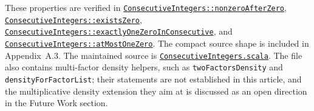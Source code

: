 {\raggedright
These properties are verified in
\href{https://github.com/thiagomata/prime-numbers/blob/modulo-article-v1.0.0/src/main/scala/v1/chapter2/div/properties/ConsecutiveIntegers.scala}{\texttt{ConsecutiveIntegers::\allowbreak nonzeroAfterZero}},
\href{https://github.com/thiagomata/prime-numbers/blob/modulo-article-v1.0.0/src/main/scala/v1/chapter2/div/properties/ConsecutiveIntegers.scala}{\texttt{ConsecutiveIntegers::\allowbreak existsZero}},
\href{https://github.com/thiagomata/prime-numbers/blob/modulo-article-v1.0.0/src/main/scala/v1/chapter2/div/properties/ConsecutiveIntegers.scala}{\texttt{ConsecutiveIntegers::\allowbreak exactlyOneZeroInConsecutive}},
and
\href{https://github.com/thiagomata/prime-numbers/blob/modulo-article-v1.0.0/src/main/scala/v1/chapter2/div/properties/ConsecutiveIntegers.scala}{\texttt{ConsecutiveIntegers::\allowbreak atMostOneZero}}.
The compact source shape is included in Appendix~A.3. The maintained source
is
\href{https://github.com/thiagomata/prime-numbers/blob/modulo-article-v1.0.0/src/main/scala/v1/chapter2/div/properties/ConsecutiveIntegers.scala}{\texttt{ConsecutiveIntegers.scala}}.
The file also contains multi-factor density helpers, such as
\texttt{twoFactorsDensity} and \texttt{densityForFactorList}; their
statements are not established in this article, and the multiplicative
density extension they aim at is discussed as an open direction in the
Future Work section.
\par}




